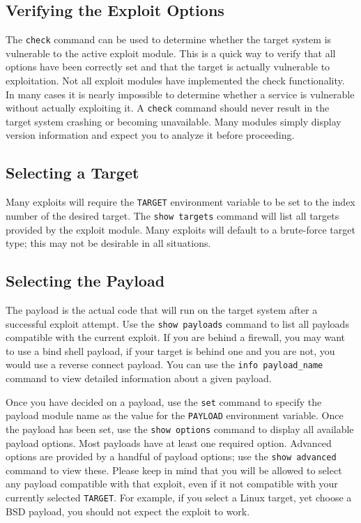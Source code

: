 \documentclass{report}
\begin{document}
		\subsection{Verifying the Exploit Options}

\par	The \texttt{check} command can be used to determine whether the target
system is vulnerable to the active exploit module. This is a quick way to
verify that all options have been correctly set and that the target is
actually vulnerable to exploitation. Not all exploit modules have implemented
the check functionality.  In many cases it is nearly impossible to determine
whether a service is vulnerable without actually exploiting it. A
\texttt{check} command should never result in the target system crashing or
becoming unavailable. Many modules simply display version information and
expect you to analyze it before proceeding.  

		\subsection{Selecting a Target}

\par Many exploits will require the \texttt{TARGET} environment variable to be
set to the index number of the desired target. The \texttt{show targets}
command will list all targets provided by the exploit module. Many exploits
will default to a brute-force target type; this may not be desirable in all
situations. 

		\subsection{Selecting the Payload}

\par	The payload is the actual code that will run on the target system after
a successful exploit attempt. Use the \texttt{show payloads} command to list
all payloads compatible with the current exploit. If you are behind a
firewall, you may want to use a bind shell payload, if your target is behind
one and you are not, you would use a reverse connect payload. You can use the
\texttt{info payload\_name} command to view detailed information about a given
payload.  

\par
Once you have decided on a payload, use the \texttt{set} command to specify
the payload module name as the value for the \texttt{PAYLOAD} environment
variable. Once the payload has been set, use the \texttt{show options} command
to display all available payload options. Most payloads have at least one
required option. Advanced options are provided by a handful of payload
options; use the \texttt{show advanced} command to view these. Please keep in
mind that you will be allowed to select any payload compatible with that
exploit, even if it not compatible with your currently selected
\texttt{TARGET}. For example, if you select a Linux target, yet choose a BSD
payload, you should not expect the exploit to work.
\end{document}
